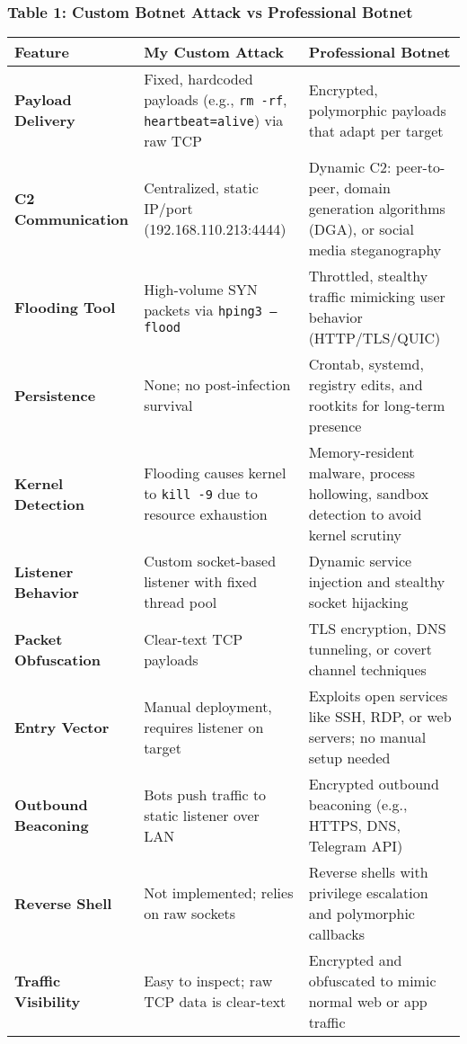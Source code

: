 \documentclass{article}
\begin{document}
\subsubsection*{Table 1: Custom Botnet Attack vs Professional Botnet}
\begin{table}[h!]
\centering
\renewcommand{\arraystretch}{1.4}
\begin{tabular}{|p{4.2cm}|p{5.5cm}|p{5.5cm}|}
\hline
\rowcolor{blue!15}
\textbf{Feature} & \textbf{My Custom Attack} & \textbf{Professional Botnet} \\
\hline
\textbf{Payload Delivery} & Fixed, hardcoded payloads (e.g., \texttt{rm -rf}, \texttt{heartbeat=alive}) via raw TCP & Encrypted, polymorphic payloads that adapt per target \\
\hline
\textbf{C2 Communication} & Centralized, static IP/port (192.168.110.213:4444) & Dynamic C2: peer-to-peer, domain generation algorithms (DGA), or social media steganography \\
\hline
\textbf{Flooding Tool} & High-volume SYN packets via \texttt{hping3 --flood} & Throttled, stealthy traffic mimicking user behavior (HTTP/TLS/QUIC) \\
\hline
\textbf{Persistence} & None; no post-infection survival & Crontab, systemd, registry edits, and rootkits for long-term presence \\
\hline
\textbf{Kernel Detection} & Flooding causes kernel to \texttt{kill -9} due to resource exhaustion & Memory-resident malware, process hollowing, sandbox detection to avoid kernel scrutiny \\
\hline
\textbf{Listener Behavior} & Custom socket-based listener with fixed thread pool & Dynamic service injection and stealthy socket hijacking \\
\hline
\textbf{Packet Obfuscation} & Clear-text TCP payloads & TLS encryption, DNS tunneling, or covert channel techniques \\
\hline
\textbf{Entry Vector} & Manual deployment, requires listener on target & Exploits open services like SSH, RDP, or web servers; no manual setup needed \\
\hline
\textbf{Outbound Beaconing} & Bots push traffic to static listener over LAN & Encrypted outbound beaconing (e.g., HTTPS, DNS, Telegram API) \\
\hline
\textbf{Reverse Shell} & Not implemented; relies on raw sockets & Reverse shells with privilege escalation and polymorphic callbacks \\
\hline
\textbf{Traffic Visibility} & Easy to inspect; raw TCP data is clear-text & Encrypted and obfuscated to mimic normal web or app traffic \\

\end{tabular}
\end{table}
\end{document}
